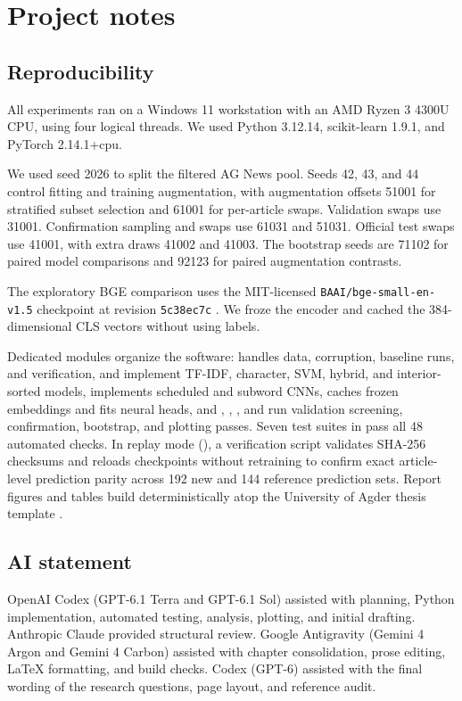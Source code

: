 \chapter{Project notes}\label{app:notes}

\section{Reproducibility}\label{app:repro}
All experiments ran on a Windows 11 workstation with an AMD Ryzen 3 4300U CPU, using four logical threads. We used Python 3.12.14, scikit-learn 1.9.1, and PyTorch 2.14.1+cpu.

We used seed 2026 to split the filtered AG News pool. Seeds 42, 43, and 44 control fitting and training augmentation, with augmentation offsets 51001 for stratified subset selection and 61001 for per-article swaps. Validation swaps use 31001. Confirmation sampling and swaps use 61031 and 51031. Official test swaps use 41001, with extra draws 41002 and 41003. The bootstrap seeds are 71102 for paired model comparisons and 92123 for paired augmentation contrasts.

The exploratory BGE comparison uses the MIT-licensed \texttt{BAAI/bge-small-en-v1.5} checkpoint at revision \texttt{5c38ec7c} \citep{bgecheckpoint}. We froze the encoder and cached the 384-dimensional CLS vectors without using labels.

Dedicated modules organize the software:  handles data, corruption, baseline runs, and verification,  and  implement TF-IDF, character, SVM, hybrid, and interior-sorted models,  implements scheduled and subword CNNs,  caches frozen embeddings and fits neural heads, and , , , and  run validation screening, confirmation, bootstrap, and plotting passes. Seven test suites in  pass all 48 automated checks. In replay mode (), a verification script validates SHA-256 checksums and reloads checkpoints without retraining to confirm exact article-level prediction parity across 192 new and 144 reference prediction sets. Report figures and tables build deterministically atop the University of Agder thesis template \citep{uiatemplate}.

\section{AI statement}\label{app:ai}
OpenAI Codex (GPT-6.1 Terra and GPT-6.1 Sol) assisted with planning, Python implementation, automated testing, analysis, plotting, and initial drafting. Anthropic Claude provided structural review. Google Antigravity (Gemini 4 Argon and Gemini 4 Carbon) assisted with chapter consolidation, prose editing, LaTeX formatting, and build checks. Codex (GPT-6) assisted with the final wording of the research questions, page layout, and reference audit.

